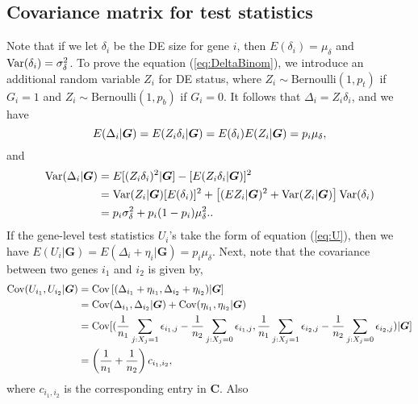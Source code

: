 \begin{appendices}
	\subsection{Covariance matrix for test statistics}\label{app:covariance}
	Note that if we let $\delta_i$ be the DE size for gene $i$, then $E(\delta_i)= \mu_{\delta}$ 
	and $\text{Var}(\delta_i) = \sigma_{\delta}^2$. To prove the equation (\ref{eq:DeltaBinom}), we 
	introduce an additional random variable $Z_i$ for DE status, where 
	$Z_i\sim \text{Bernoulli}(1, p_t)$ if $G_i = 1$ and $Z_i\sim \text{Bernoulli}(1, p_b)$ if $G_i 
	= 0$. It follows that $\Delta_i =Z_i\delta_i$, and we have 
	\begin{equation}\notag
	E(\Delta_i|\bm G) = E(Z_i\delta_i|\bm G) = E(\delta_i)E(Z_i|\bm G)=  p_i\mu_{\delta},
	\end{equation}
	and 
	\begin{equation}\notag
	\begin{aligned}
	\text{Var}(\Delta_i|\bm G) & = E[(Z_i\delta_i)^2|\bm G]- [E(Z_i\delta_i|\bm G)]^2 \\
	& = \text{Var}(Z_i|\bm G)[E(\delta_i)]^2 + \left[(EZ_i|\bm G)^2 + 
	\text{Var}(Z_i|\bm G)\right]\text{Var}(\delta_i) \\
	& =p_i\sigma_{\delta}^2 + p_i(1-p_i)\mu_{\delta}^2..
	\end{aligned}
	\end{equation}
	If the gene-level test statistics $U_i$'s take the form of equation (\ref{eq:U}), then we have 
	$E(U_i|\bm G) = E(\Delta_i + \eta_i|\bm G)  = p_i\mu_{\delta}$. Next, note that the covariance 
	between two genes $i_1$ and $i_2$ is given by, 
	\begin{equation}\label{eq:app1}
	\begin{aligned}
	\text{Cov}(U_{i_1}, U_{i_2}|\bm G) & =\text{Cov}\left[(\Delta_{i_1} + \eta_{i_1}, \Delta_{i_2} + 
	\eta_{i_2})|\bm G\right] \\
	& = \text{Cov}(\Delta_{i_1}, \Delta_{i_2}|\bm G) + \text{Cov}(\eta_{i_1}, \eta_{i_2}|\bm G)\\
	& = \text{Cov}[(\dfrac{1}{n_1}\sum_{j: X_j=1}\epsilon_{i_1,j}-
	\dfrac{1}{n_2}\sum_{j: X_j=0}\epsilon_{i_1,j}, \dfrac{1}{n_1}\sum_{j: X_j=1}\epsilon_{i_2,j}-
	\dfrac{1}{n_2}\sum_{j: X_j=0}\epsilon_{i_2,j})|\bm G]\\
	& = \left(\frac{1}{n_1} + \frac{1}{n_2}\right)c_{i_1,i_2},
	\end{aligned}
	\end{equation}
	where $c_{i_1,i_2}$ is the corresponding entry in $\bm C$. Also 
	\begin{equation}\label{eq:app2}

\end{equation}
\end{appendices}
